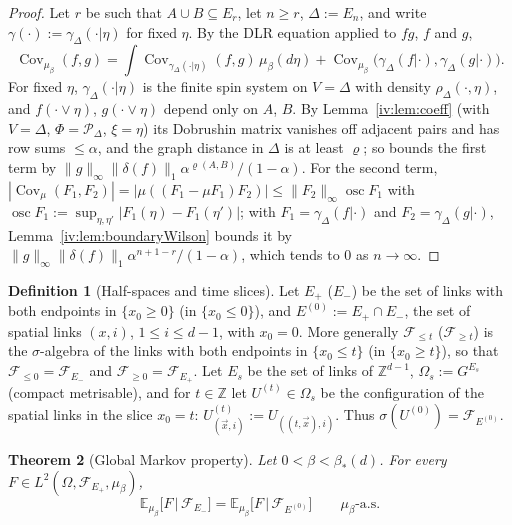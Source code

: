 \documentclass[11pt,a4paper]{article}
\newtheorem{theorem}{Theorem}[section]
\theoremstyle{definition}
\newtheorem{definition}[theorem]{Definition}
\theoremstyle{remark}
\DeclareMathOperator{\Cov}{Cov}
\DeclareMathOperator{\osc}{osc}
\newcommand{\Z}{\mathbb{Z}}
\newcommand{\E}{\mathbb{E}}
\newcommand{\cF}{\mathcal{F}}
\newcommand{\cP}{\mathcal{P}}
\newcommand{\norm}[1]{\lVert #1\rVert}
\newcommand{\Flab}[2]{\cite[#1 \texttt{#2}]{F}}
\newcommand{\bS}{\beta_*}
\begin{document}
\begin{proof}
Let $r$ be such that $A\cup B\subseteq E_r$, let $n\ge r$, $\Delta:=E_n$, and write $\gamma(\cdot):=\gamma_\Delta(\cdot|\eta)$
for fixed $\eta$. By the DLR equation applied to $fg$, $f$ and $g$,
\[
\Cov_{\mu_\beta}(f,g)=\int\Cov_{\gamma_\Delta(\cdot|\eta)}(f,g)\,\mu_\beta(d\eta)+\Cov_{\mu_\beta}\bigl(\gamma_\Delta(f|\cdot),\gamma_\Delta(g|\cdot)\bigr).
\]
For fixed $\eta$, $\gamma_\Delta(\cdot|\eta)$ is the finite spin system on $V=\Delta$ with density $\rho_\Delta(\cdot,\eta)$, and
$f(\cdot\vee\eta)$, $g(\cdot\vee\eta)$ depend only on $A$, $B$. By Lemma~\ref{iv:lem:coeff} (with $V=\Delta$, $\Phi=\cP_\Delta$,
$\xi=\eta$) its Dobrushin matrix vanishes off adjacent pairs and has row sums $\le\alpha$, and the graph distance in $\Delta$ is
at least $\varrho$; so \Flab{Theorem}{thm:dobrushin} bounds the first term by
$\norm g_\infty\norm{\delta(f)}_1\alpha^{\varrho(A,B)}/(1-\alpha)$. For the second term, $|\Cov_\mu(F_1,F_2)|=|\mu((F_1-\mu F_1)F_2)|\le
\norm{F_2}_\infty\osc F_1$ with $\osc F_1:=\sup_{\eta,\eta'}|F_1(\eta)-F_1(\eta')|$; with $F_1=\gamma_\Delta(f|\cdot)$ and
$F_2=\gamma_\Delta(g|\cdot)$, Lemma~\ref{iv:lem:boundaryWilson} bounds it by
$\norm g_\infty\norm{\delta(f)}_1\alpha^{n+1-r}/(1-\alpha)$, which tends to $0$ as $n\to\infty$.
\end{proof}

\begin{definition}[Half-spaces and time slices]\label{iv:def:halfspaces}
Let $E_+$ ($E_-$) be the set of links with both endpoints in $\{x_0\ge0\}$ (in $\{x_0\le0\}$), and $E^{(0)}:=E_+\cap E_-$, the set
of spatial links $(x,i)$, $1\le i\le d-1$, with $x_0=0$. More generally $\cF_{\le t}$ ($\cF_{\ge t}$) is the $\sigma$-algebra of
the links with both endpoints in $\{x_0\le t\}$ (in $\{x_0\ge t\}$), so that $\cF_{\le0}=\cF_{E_-}$ and $\cF_{\ge0}=\cF_{E_+}$.
Let $E_s$ be the set of links of $\Z^{d-1}$, $\Omega_s:=G^{E_s}$ (compact metrisable), and for $t\in\Z$ let
$U^{(t)}\in\Omega_s$ be the configuration of the spatial links in the slice $x_0=t$:
$U^{(t)}_{(\vec x,i)}:=U_{((t,\vec x),i)}$. Thus $\sigma(U^{(0)})=\cF_{E^{(0)}}$.
\end{definition}

\begin{theorem}[Global Markov property]\label{iv:thm:markov}
Let $0<\beta<\bS(d)$. For every $F\in L^2(\Omega,\cF_{E_+},\mu_\beta)$,
\[
\E_{\mu_\beta}\bigl[F\,\big|\,\cF_{E_-}\bigr]=\E_{\mu_\beta}\bigl[F\,\big|\,\cF_{E^{(0)}}\bigr]\qquad\mu_\beta\text{-a.s.}
\]
\end{theorem}
\end{document}
